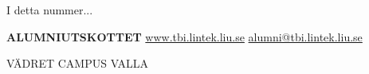 \documentclass[10pt,final,hyphenatedtitles]{papertex}
\renewcommand{\todo}[1]{}
\begin{document}
\begin{frontpage}
\begin{indexblock}{I detta nummer...}




\end{indexblock}


\todo{ta bort, sätt in logo, hemsida, kontaktuppgifter}
\begin{authorblock}
\textbf{ALUMNIUTSKOTTET}
\url{www.tbi.lintek.liu.se}
\href{mailto:alumni@tbi.lintek.liu.se}{alumni@tbi.lintek.liu.se}
\end{authorblock}



\begin{weatherblock}{VÄDRET CAMPUS VALLA}
\end{weatherblock}
\end{frontpage}



\newsection{}



\newssep



\newssep











\newssep



\newssep



\clearpage


\end{document}
